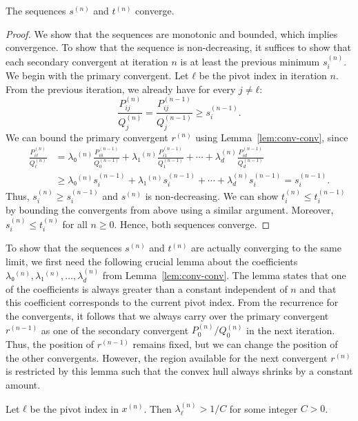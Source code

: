 \begin{lemma}
  The sequences $s^{(n)}$ and $t^{(n)}$ converge.
\end{lemma}

\begin{proof}
  We show that the sequences are monotonic and bounded, which implies convergence.
  To show that the sequence is non-decreasing,
  it suffices to show that each secondary convergent at iteration $n$
  is at least the previous minimum $s_i^{(n)}$.
  We begin with the primary convergent.
  Let $ℓ$ be the pivot index in iteration $n$.
  From the previous iteration, we already have for every $j ≠ ℓ$:
  \[
    \frac{P_{ij}^{(n)}}{Q_j^{(n)}} = \frac{P_{ij}^{(n-1)}}{Q_j^{(n-1)}} ≥ s_i^{(n-1)}.
  \]
  We can bound the primary convergent $r^{(n)}$ using Lemma~\ref{lem:conv-conv}, since
  \begin{align*}
    \frac{P_{iℓ}^{(n)}}{Q_ℓ^{(n)}}
    & = λ₀^{(n)} \frac{P_{i0}^{(n-1)}}{Q_0^{(n-1)}} + λ₁^{(n)} \frac{P_{i1}^{(n-1)}}{Q_1^{(n-1)}} + ⋯ + λ_d^{(n)} \frac{P_{id}^{(n-1)}}{Q_d^{(n-1)}} \\
    & ≥ λ₀^{(n)} s_i^{(n-1)} + λ₁^{(n)} s_i^{(n-1)} + ⋯ + λ_d^{(n)} s_i^{(n-1)}
      = s_i^{(n-1)}.
  \end{align*}
  Thus, $s_i^{(n)} ≥ s_i^{(n-1)}$ and $s^{(n)}$ is non-decreasing.
  We can show $t_i^{(n)} ≤ t_i^{(n-1)}$ by bounding the convergents from above using a similar argument.
  Moreover, $s_i^{(n)} ≤ t_i^{(n)}$ for all $n ≥ 0$.
  Hence, both sequences converge.
\end{proof}

To show that the sequences $s^{(n)}$ and $t^{(n)}$ are actually
converging to the same limit, we first need the following crucial lemma about the
coefficients $λ₀^{(n)}, λ₁^{(n)}, …, λ_d^{(n)}$ from Lemma~\ref{lem:conv-conv}.
The lemma states that one of the coefficients is always greater than a constant
independent of $n$ and that this coefficient corresponds to the current pivot index.
From the recurrence for the convergents,
it follows that we always carry over the primary convergent $r^{(n-1)}$ as one
of the secondary convergent $P_0^{(n)}/Q_0^{(n)}$ in the next iteration.
Thus, the position of $r^{(n-1)}$ remains fixed,
but we can change the position of the other convergents.
However,
the region available for the next convergent $r^{(n)}$ is restricted by this lemma
such that the convex hull always shrinks by a constant amount.

\begin{lemma}
  \label{lem:lambda-pos}
  Let $ℓ$ be the pivot index in $x^{(n)}$.
  Then $λ_ℓ^{(n)} > 1/C$ for some integer $C > 0$.
\end{lemma}

